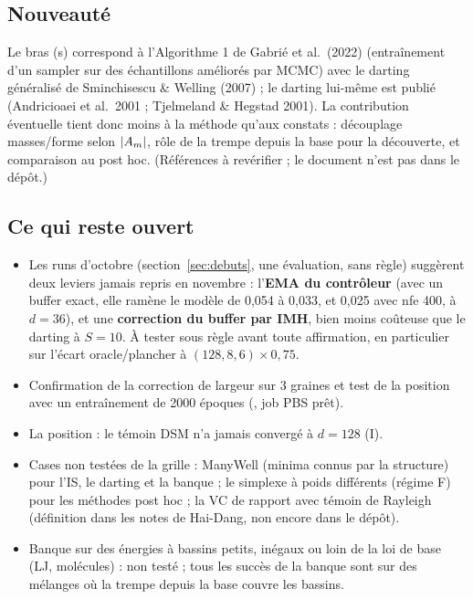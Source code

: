 \subsection{Nouveauté}
Le bras (s) correspond à l'Algorithme 1 de Gabrié et al.\ (2022) (entraînement d'un sampler sur des échantillons améliorés par MCMC) avec le darting généralisé de Sminchisescu \& Welling (2007) ; le darting lui-même est publié (Andricioaei et al.\ 2001 ; Tjelmeland \& Hegstad 2001). La contribution éventuelle tient donc moins à la méthode qu'aux constats : découplage masses/forme selon $|A_m|$, rôle de la trempe depuis la base pour la découverte, et comparaison au post hoc. (Références à revérifier ; le document  n'est pas dans le dépôt.)

\subsection{Ce qui reste ouvert}
\begin{itemize}
  \item Les runs d'octobre (section~\ref{sec:debuts}, une évaluation, sans règle) suggèrent deux leviers jamais repris en novembre : l'\textbf{EMA du contrôleur} (avec un buffer exact, elle ramène le modèle de 0,054 à 0,033, et 0,025 avec nfe 400, à $d=36$), et une \textbf{correction du buffer par IMH}, bien moins coûteuse que le darting à $S=10$. À tester sous règle avant toute affirmation, en particulier sur l'écart oracle/plancher à $(128,8,6)\times0{,}75$.
  \item Confirmation de la correction de largeur sur 3 graines et test de la position avec un entraînement de 2000 époques (, job PBS prêt).
  \item La position : le témoin DSM n'a jamais convergé à $d=128$ (I).
  \item Cases non testées de la grille : ManyWell (minima connus par la structure) pour l'IS, le darting et la banque ; le simplexe à poids différents (régime F) pour les méthodes post hoc ; la VC de rapport avec témoin de Rayleigh (définition dans les notes de Hai-Dang, non encore dans le dépôt).
  \item Banque sur des énergies à bassins petits, inégaux ou loin de la loi de base (LJ, molécules) : non testé ; tous les succès de la banque sont sur des mélanges où la trempe depuis la base couvre les bassins.
\end{itemize}

